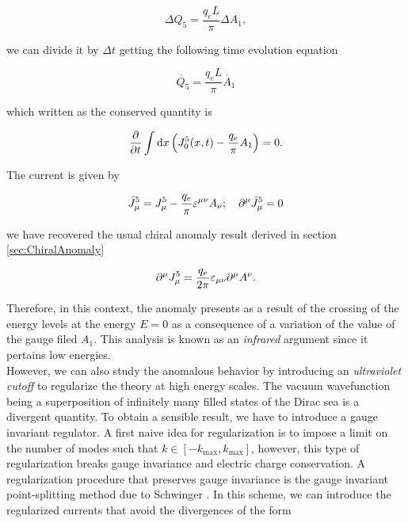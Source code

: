 \begin{equation}
\Delta Q_5 = \frac{q_e L}{\pi}\Delta A_1,
\end{equation}

we can divide it by $\Delta t$  getting the following time evolution equation

\begin{equation}
\dot{Q_5} = \frac{q_e L}{\pi}\dot{A_1}
\end{equation}

which written as the conserved quantity is

\begin{equation}
\frac{\partial}{\partial t} \int \dd{x}\qty(J^5_0(x,t) - \frac{q_e}{\pi}A_1) = 0.
\end{equation}

The current is given by

\begin{equation}
\bar{J}_\mu^5  = J_\mu^5 - \frac{q_e}{\pi}\varepsilon^{\mu\nu} A_\nu;\quad \partial^\mu\bar{J}_\mu^5=0
\end{equation}

we have recovered the usual chiral anomaly result derived in section \ref{sec:ChiralAnomaly}

\begin{equation}
\partial^\mu J_\mu^5 = \frac{q_e}{2\pi}\varepsilon_{\mu\nu} \partial^\mu A^\nu.
\label{eq:anomaly2}
\end{equation}

Therefore, in this context, the anomaly presents as a result of the crossing of the energy levels at the energy $E=0$ as a consequence of a variation of the value of the gauge filed $A_1$. This analysis is known as an \emph{infrared} argument since it pertains low energies.\\

However, we can also study the anomalous behavior by introducing an \emph{ultraviolet cutoff} to regularize the theory at high energy scales. The vacuum wavefunction being a superposition of infinitely many filled states of the Dirac sea is a divergent quantity. To obtain a sensible result, we have to introduce a gauge invariant regulator. A first naive idea for regularization is to impose a limit on the number of modes such that $k\in[-k_{\text{max}},k_{\text{max}}]$, however, this type of regularization breaks gauge invariance and electric charge conservation. A regularization procedure that preserves gauge invariance is the gauge invariant point-splitting method due to Schwinger \cite{Sch1951}. In this scheme, we can introduce the regularized currents that avoid the divergences of the form

